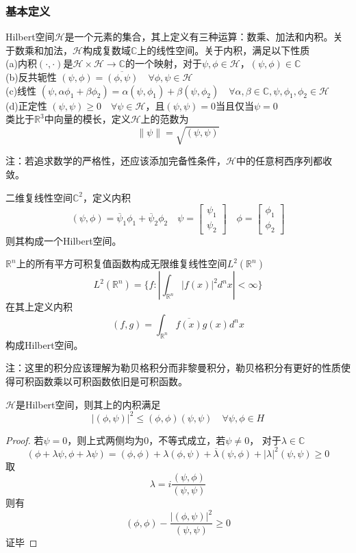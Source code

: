 \subsubsection{基本定义}
Hilbert空间$\mathcal{H}$是一个元素的集合，其上定义有三种运算：数乘、加法和内积。关于数乘和加法，$\mathcal{H}$构成复数域$\mathbb{C}$上的线性空间。关于内积，满足以下性质
\\ (a)内积$(\cdot,\cdot)$是$\mathcal{H}\times\mathcal{H}\to \mathbb{C}$的一个映射，对于$\psi,\phi\in\mathcal{H}$，$(\psi,\phi)\in\mathbb{C}$
\\ (b)反共轭性 $(\psi,\phi)=\overline{(\phi,\psi)}\quad\forall\phi,\psi\in\mathcal{H}$
\\ (c)线性 $(\psi,\alpha\phi_1+\beta\phi_2)=\alpha(\psi,\phi_1)+\beta(\psi,\phi_2)\quad\forall\alpha,\beta\in\mathbb{C},\psi,\phi_1,\phi_2\in\mathcal{H}$
\\ (d)正定性 $(\psi,\psi)\geq 0\quad\forall\psi\in\mathcal{H}$，且$(\psi,\psi)=0$当且仅当$\psi=0$
\\ 类比于$\mathbb{R}^3$中向量的模长，定义$\mathcal{H}$上的范数为
$$\|\psi\|=\sqrt{(\psi,\psi)}$$

注：若追求数学的严格性，还应该添加完备性条件，$\mathcal{H}$中的任意柯西序列都收敛。

\begin{example}
    二维复线性空间$\mathbb{C}^2$，定义内积
    $$(\psi,\phi)=\overline{\psi}_1\phi_1+\overline{\psi}_2\phi_2\quad \psi=\left[\begin{array}{c}
        \psi_1\\
        \psi_2
    \end{array}\right]\quad \phi=\left[\begin{array}{c}
        \phi_1\\
        \phi_2
    \end{array}\right]$$
    则其构成一个Hilbert空间。
\end{example}
\begin{example}
    $\mathbb{R}^n$上的所有平方可积复值函数构成无限维复线性空间$L^2(\mathbb{R}^n)$
    $$L^2(\mathbb{R}^n)=\{f:\left|\int_{\mathbb{R}^n}|f(x)|^2d^nx\right|<\infty\}$$
    在其上定义内积
    $$(f,g)=\int_{\mathbb{R}^n}\overline{f(x)}g(x)d^nx$$
    构成Hilbert空间。

    注：这里的积分应该理解为勒贝格积分而非黎曼积分，勒贝格积分有更好的性质使得可积函数乘以可积函数依旧是可积函数。
\end{example}
\begin{theorem}
    $\mathcal{H}$是Hilbert空间，则其上的内积满足
    $$|(\phi,\psi)|^2\leq(\phi,\phi)(\psi,\psi)\quad\forall\psi,\phi\in H$$
\end{theorem}
\begin{proof}
    若$\psi=0$，则上式两侧均为0，不等式成立，若$\psi\neq 0$，
    对于$\lambda\in\mathbb{C}$
    $$(\phi+\lambda\psi,\phi+\lambda\psi)=(\phi,\phi)+\lambda(\phi,\psi)+\overline{\lambda}(\psi,\phi)+|\lambda|^2(\psi,\psi)\geq 0$$
    取$$\lambda=i\frac{(\psi,\phi)}{(\psi,\psi)}$$
    则有
    $$(\phi,\phi)-\frac{|(\phi,\psi)|^2}{(\psi,\psi)}\geq 0$$
    证毕
\end{proof}
